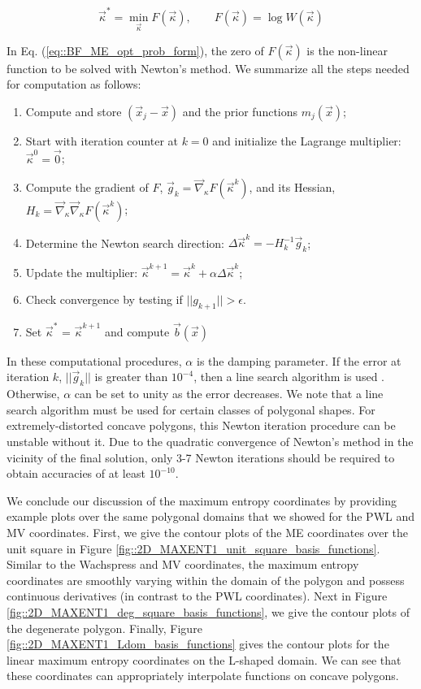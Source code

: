 \begin{equation}
\label{eq::BF_ME_opt_prob_form}
\vec{\kappa}^* = \min_{\vec{\kappa}} F(\vec{\kappa}) , \qquad F(\vec{\kappa}) = \log W (\vec{\kappa})
\end{equation}

\noindent In Eq. (\ref{eq::BF_ME_opt_prob_form}), the zero of $F(\vec{\kappa})$ is the non-linear function to be solved with Newton's method. We summarize all the steps needed for computation as follows:

\begin{enumerate}
\item Compute and store $(\vec{x}_j - \vec{x})$ and the prior functions $m_j (\vec{x})$;
\item Start with iteration counter at $k=0$ and initialize the Lagrange multiplier: $\vec{\kappa}^0 = \vec{0}$;
\item Compute the gradient of $F$, $\vec{g}_k = \vec{\nabla}_{\kappa} F (\vec{\kappa}^k)$, and its Hessian, $H_k = \vec{\nabla}_{\kappa} \vec{\nabla}_{\kappa}  F (\vec{\kappa}^k)$;
\item Determine the Newton search direction: $\Delta \vec{\kappa}^k = - H_k^{-1} \vec{g}_k$;
\item Update the multiplier: $\vec{\kappa}^{k+1} =\vec{\kappa}^k + \alpha \Delta \vec{\kappa}^k$;
\item Check convergence by testing if $|| g_{k+1} || > \epsilon$.
\item Set $\vec{\kappa}^*$ = $\vec{\kappa}^{k+1}$ and compute $\vec{b} (\vec{x})$
\end{enumerate}

In these computational procedures, $\alpha$ is the damping parameter. If the error at iteration $k$, $|| \vec{g}_{k} || $ is greater than $10^{-4}$, then a line search algorithm is used \cite{burden2001numerical}. Otherwise, $\alpha$ can be set to unity as the error decreases. We note that a line search algorithm must be used for certain classes of polygonal shapes. For extremely-distorted concave polygons, this Newton iteration procedure can be unstable without it. Due to the quadratic convergence of Newton's method in the vicinity of the final solution, only 3-7 Newton iterations should be required to obtain accuracies of at least $10^{-10}$. 

We conclude our discussion of the maximum entropy coordinates by providing example plots over the same polygonal domains that we showed for the PWL and MV coordinates. First, we give the contour plots of the ME coordinates over the unit square in Figure \ref{fig::2D_MAXENT1_unit_square_basis_functions}. Similar to the Wachspress and MV coordinates, the maximum entropy coordinates are smoothly varying within the domain of the polygon and possess continuous derivatives (in contrast to the PWL coordinates). Next in Figure \ref{fig::2D_MAXENT1_deg_square_basis_functions}, we give the contour plots of the degenerate polygon. Finally, Figure \ref{fig::2D_MAXENT1_Ldom_basis_functions} gives the contour plots for the linear maximum entropy coordinates on the L-shaped domain. We can see that these coordinates can appropriately interpolate functions on concave polygons.

